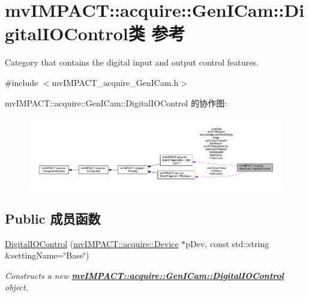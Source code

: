 \hypertarget{classmv_i_m_p_a_c_t_1_1acquire_1_1_gen_i_cam_1_1_digital_i_o_control}{\section{mv\+I\+M\+P\+A\+C\+T\+:\+:acquire\+:\+:Gen\+I\+Cam\+:\+:Digital\+I\+O\+Control类 参考}
\label{classmv_i_m_p_a_c_t_1_1acquire_1_1_gen_i_cam_1_1_digital_i_o_control}
}


Category that contains the digital input and output control features.  




{\ttfamily \#include $<$mv\+I\+M\+P\+A\+C\+T\+\_\+acquire\+\_\+\+Gen\+I\+Cam.\+h$>$}



mv\+I\+M\+P\+A\+C\+T\+:\+:acquire\+:\+:Gen\+I\+Cam\+:\+:Digital\+I\+O\+Control 的协作图\+:
\nopagebreak
\begin{figure}[H]
\begin{center}
\leavevmode
\includegraphics[width=350pt]{classmv_i_m_p_a_c_t_1_1acquire_1_1_gen_i_cam_1_1_digital_i_o_control__coll__graph}
\end{center}
\end{figure}
\subsection*{Public 成员函数}
\begin{DoxyCompactItemize}
\item 
\hyperlink{classmv_i_m_p_a_c_t_1_1acquire_1_1_gen_i_cam_1_1_digital_i_o_control_a7a1bf59d9fddd27e95b04e12e4039b18}{Digital\+I\+O\+Control} (\hyperlink{classmv_i_m_p_a_c_t_1_1acquire_1_1_device}{mv\+I\+M\+P\+A\+C\+T\+::acquire\+::\+Device} $\ast$p\+Dev, const std\+::string \&setting\+Name=\char`\"{}Base\char`\"{})
\begin{DoxyCompactList}\small\item\em Constructs a new {\bfseries \hyperlink{classmv_i_m_p_a_c_t_1_1acquire_1_1_gen_i_cam_1_1_digital_i_o_control}{mv\+I\+M\+P\+A\+C\+T\+::acquire\+::\+Gen\+I\+Cam\+::\+Digital\+I\+O\+Control}} object. \end{DoxyCompactList}\end{DoxyCompactItemize}
